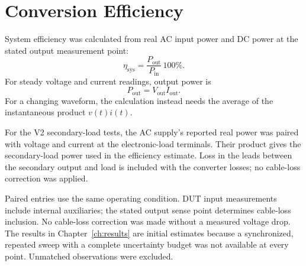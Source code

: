 \section{Conversion Efficiency}
\label{sec:method-efficiency}

System efficiency was calculated from real AC input power and DC power at the
stated output measurement point:
\begin{equation}
 \eta_{\mathrm{sys}}=
 \frac{P_{\mathrm{out}}}{P_{\mathrm{in}}}\,100\%.
 \label{eq:efficiency-method}
\end{equation}
For steady voltage and current readings, output power is
\begin{equation}
 P_{\mathrm{out}}=V_{\mathrm{out}}I_{\mathrm{out}}.
 \label{eq:pout-method}
\end{equation}
For a changing waveform, the calculation instead needs the average of the
instantaneous product \(v(t)i(t)\).

For the V2 secondary-load tests, the AC supply's reported real power was
paired with voltage and current at the electronic-load terminals. Their
product gives the secondary-load power used in the efficiency estimate.
Loss in the leads between the secondary output and load is included with
the converter losses; no cable-loss correction was applied.

Paired entries use the same operating condition. DUT input measurements include
internal auxiliaries; the stated output sense point determines cable-loss
inclusion. No cable-loss correction was made without a measured voltage drop.
The results in Chapter~\ref{ch:results} are initial estimates because a
synchronized, repeated sweep with a complete uncertainty budget was not
available at every point. Unmatched observations were excluded.
